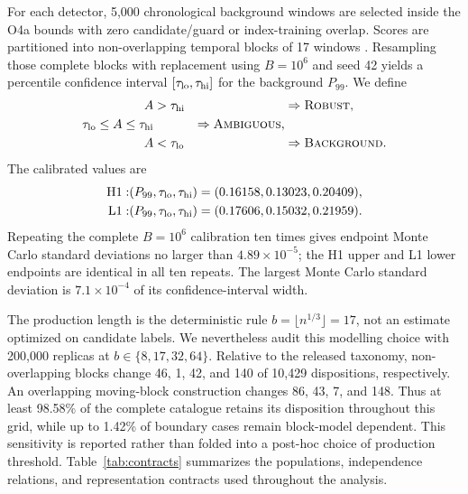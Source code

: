 \documentclass[12pt]{article}
\newcommand{\robust}{\textsc{Robust}}
\newcommand{\ambiguous}{\textsc{Ambiguous}}
\newcommand{\background}{\textsc{Background}}
\begin{document}
For each detector, 5,000 chronological background windows are selected inside
the O4a bounds with zero candidate/guard or index-training overlap.  Scores are
partitioned into non-overlapping temporal blocks of 17 windows
\cite{kunsch1989}.  Resampling those complete blocks with replacement using
$B=10^6$ and seed 42 yields a percentile confidence interval
$[\tau_{\rm lo},\tau_{\rm hi}]$ for the background $P_{99}$.  We define
\begin{align}
 A &> \tau_{\rm hi} &&\Rightarrow \robust,\\
 \tau_{\rm lo}\le A\le\tau_{\rm hi} &&\Rightarrow \ambiguous,\\
 A &< \tau_{\rm lo} &&\Rightarrow \background.
\end{align}
The calibrated values are
\begin{align}
\mathrm{H1}:&(P_{99},\tau_{\rm lo},\tau_{\rm hi})
  =(0.16158,0.13023,0.20409),\\
\mathrm{L1}:&(P_{99},\tau_{\rm lo},\tau_{\rm hi})
  =(0.17606,0.15032,0.21959).
\end{align}
Repeating the complete $B=10^6$ calibration ten times gives endpoint Monte
Carlo standard deviations no larger than $4.89\times10^{-5}$; the H1 upper and
L1 lower endpoints are identical in all ten repeats.  The largest Monte Carlo
standard deviation is $7.1\times10^{-4}$ of its confidence-interval width.

The production length is the deterministic rule
$b=\lfloor n^{1/3}\rfloor=17$, not an estimate optimized on candidate labels.
We nevertheless audit this modelling choice with 200,000 replicas at
$b\in\{8,17,32,64\}$.  Relative to the released taxonomy, non-overlapping
blocks change 46, 1, 42, and 140 of 10,429 dispositions, respectively.  An
overlapping moving-block construction changes 86, 43, 7, and 148.  Thus at
least 98.58\% of the complete catalogue retains its disposition throughout
this grid, while up to 1.42\% of boundary cases remain block-model dependent.
This sensitivity is reported rather than folded into a post-hoc choice of
production threshold.
Table~\ref{tab:contracts} summarizes the populations, independence relations,
and representation contracts used throughout the analysis.
\end{document}
